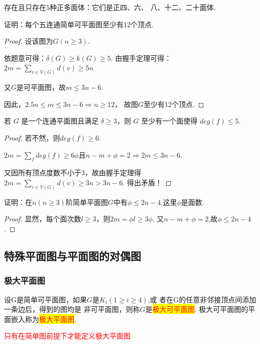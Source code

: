 \begin{theorem}
存在且只存在$5$种正多面体：它们是正四、六、
八、十二、二十面体.
\end{theorem}

\begin{example}
	证明：每个五连通简单可平面图至少有12个顶点.
\end{example}
\begin{proof}
	设该图为$G(n\geq 3)$.
	
	依题意可得：$\delta(G)\geq k(G)\geq 5$. 由握手定理可得： $2m=\sum\limits_{v\in V(G)}d(v)\geq 5n$
	
	又$G$是可平面图，故$m\leq 3n-6$.
	
	因此，$2.5n\leq m \leq 3n-6\Rightarrow n\geq 12$， 故图$G$至少有12个顶点.
\end{proof}


\begin{example}
	若 $G$ 是一个连通平面图且满足 $\delta\geq3$，则 $G$ 至少有一个面使得 $deg(f) \leq 5$.
\end{example}
\begin{proof}
	若不然，则$deg(f) \geq 6$.
	
	$2m=\sum\limits_{f } deg(f) \geq 6\phi \mbox{且} n-m+\phi = 2\Rightarrow 2m \leq  3n-6$.
	
	又因所有顶点度数不小于3，故由握手定理得$2m=\sum\limits_{v\in V(G)}d(v)\geq 3n>3n-6$. 得出矛盾！
\end{proof}
\begin{example}
	证明：在$n(n\geq 3)$阶简单平面图$G$中有$\phi \leq 2n-4$,这里$\phi$是面数.
\end{example}
\begin{proof}
显然，每个面次数$l\geq 3$，则$2m= \phi l\geq 3\phi $. 又$n-m+\phi = 2$,故$\phi \leq 2n-4$.
\end{proof}

\subsection{特殊平面图与平面图的对偶图}
\subsubsection{极大平面图}
\begin{definition}
设G是简单可平面图，如果$G$是$K_i(1\geq i \geq 4)$,或
者在G的任意非邻接顶点间添加一条边后，得到的图均是
非可平面图，则称$G$是\colorbox{yellow}{\textcolor{red}{极大可平面图}}. 极大可平面图的平面嵌入称为\colorbox{yellow}{\textcolor{red}{极大平面图}}.
\end{definition}
\begin{note}
	\textcolor{red}{只有在简单图前提下才能定义极大平面图}
\end{note}

